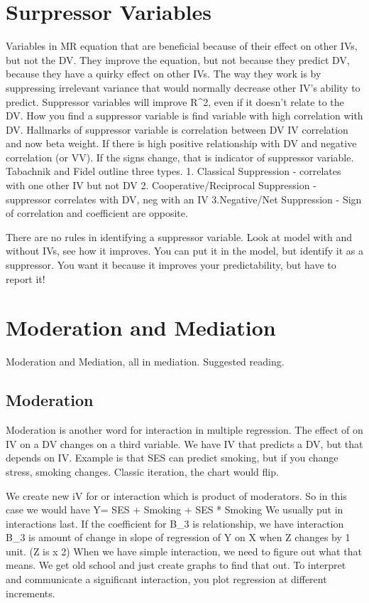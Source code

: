 \documentclass[]{book}
\theoremstyle{definition}
\theoremstyle{definition}
\theoremstyle{definition}
\theoremstyle{remark}
\begin{document}
\section{Surpressor Variables}\label{surpressor-variables}

Variables in MR equation that are beneficial because of their effect on
other IVs, but not the DV. They improve the equation, but not because
they predict DV, because they have a quirky effect on other IVs. The way
they work is by suppressing irrelevant variance that would normally
decrease other IV's ability to predict. Suppressor variables will
improve R\^{}2, even if it doesn't relate to the DV. How you find a
suppressor variable is find variable with high correlation with DV.
Hallmarks of suppressor variable is correlation between DV IV
correlation and now beta weight. If there is high positive relationship
with DV and negative correlation (or VV). If the signs change, that is
indicator of suppressor variable. Tabachnik and Fidel outline three
types. 1. Classical Suppression - correlates with one other IV but not
DV 2. Cooperative/Reciprocal Suppression - suppressor correlates with
DV, neg with an IV 3.Negative/Net Suppression - Sign of correlation and
coefficient are opposite.

There are no rules in identifying a suppressor variable. Look at model
with and without IVs, see how it improves. You can put it in the model,
but identify it as a suppressor. You want it because it improves your
predictability, but have to report it!

\section{Moderation and Mediation}\label{moderation-and-mediation}

Moderation and Mediation, all in mediation. Suggested reading.

\subsection{Moderation}\label{moderation}

Moderation is another word for interaction in multiple regression. The
effect of on IV on a DV changes on a third variable. We have IV that
predicts a DV, but that depends on IV. Example is that SES can predict
smoking, but if you change stress, smoking changes. Classic iteration,
the chart would flip.

We create new iV for or interaction which is product of moderators. So
in this case we would have Y= SES + Smoking + SES * Smoking We usually
put in interactions last. If the coefficient for B\_3 is relationship,
we have interaction B\_3 is amount of change in slope of regression of Y
on X when Z changes by 1 unit. (Z is x 2) When we have simple
interaction, we need to figure out what that means. We get old school
and just create graphs to find that out. To interpret and communicate a
significant interaction, you plot regression at different increments.
\end{document}
